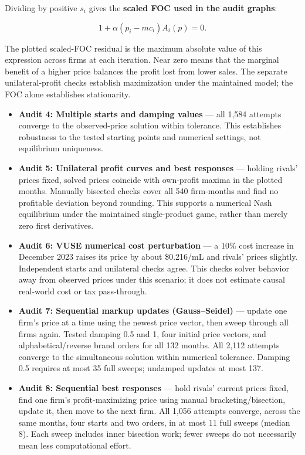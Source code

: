\documentclass[10pt,]{article}
\begin{document}
Dividing by positive \(s_i\) gives the \textbf{scaled FOC used in the
audit graphs}:

\[
  \boxed{1+\alpha(p_i-mc_i)A_i(p)=0.}
  \]

The plotted scaled-FOC residual is the maximum absolute value of this
expression across firms at each iteration. Near zero means that the
marginal benefit of a higher price balances the profit lost from lower
sales. The separate unilateral-profit checks establish maximization
under the maintained model; the FOC alone establishes stationarity.

\begin{itemize}
\item
  \textbf{Audit 4: Multiple starts and damping values} --- all 1,584
  attempts converge to the observed-price solution within tolerance.
  This establishes robustness to the tested starting points and
  numerical settings, not equilibrium uniqueness.
\item
  \textbf{Audit 5: Unilateral profit curves and best responses} ---
  holding rivals' prices fixed, solved prices coincide with own-profit
  maxima in the plotted months. Manually bisected checks cover all 540
  firm-months and find no profitable deviation beyond rounding. This
  supports a numerical Nash equilibrium under the maintained
  single-product game, rather than merely zero first derivatives.
\item
  \textbf{Audit 6: VUSE numerical cost perturbation} --- a 10\% cost
  increase in December 2023 raises its price by about \$0.216/mL and
  rivals' prices slightly. Independent starts and unilateral checks
  agree. This checks solver behavior away from observed prices under
  this scenario; it does not estimate causal real-world cost or tax
  pass-through.
\item
  \textbf{Audit 7: Sequential markup updates (Gauss--Seidel)} --- update
  one firm's price at a time using the newest price vector, then sweep
  through all firms again. Tested damping 0.5 and 1, four initial price
  vectors, and alphabetical/reverse brand orders for all 132 months. All
  2,112 attempts converge to the simultaneous solution within numerical
  tolerance. Damping 0.5 requires at most 35 full sweeps; undamped
  updates at most 137.
\item
  \textbf{Audit 8: Sequential best responses} --- hold rivals' current
  prices fixed, find one firm's profit-maximizing price using manual
  bracketing/bisection, update it, then move to the next firm. All 1,056
  attempts converge, across the same months, four starts and two orders,
  in at most 11 full sweeps (median 8). Each sweep includes inner
  bisection work; fewer sweeps do not necessarily mean less
  computational effort.
\end{itemize}
\end{document}
